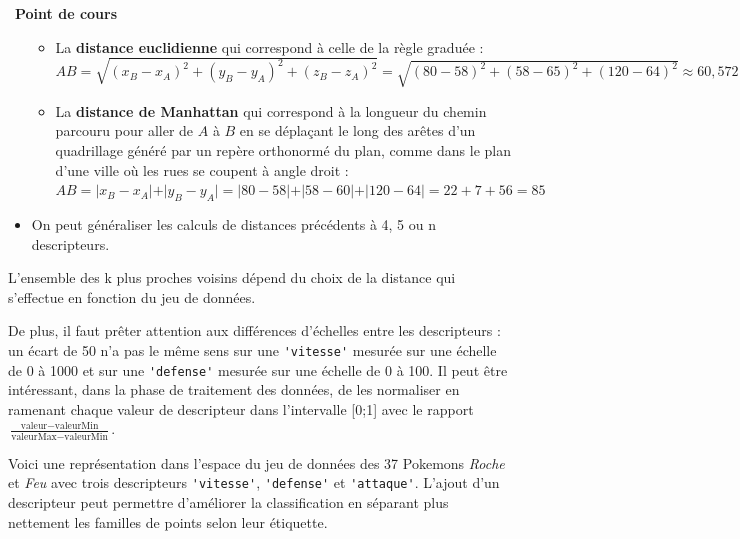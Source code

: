 \documentclass[
  11pt,
]{article}
\newcommand{\passthrough}[1]{#1}
\providecommand{\tightlist}{%
  \setlength{\itemsep}{0pt}\setlength{\parskip}{0pt}}
\newcounter{def}
\newcounter{cours}
\newenvironment{cours}[1]
{\par \medskip   \addtocounter{cours}{1} \noindent  
\begin{bclogo}[arrondi =0.1,  ombre = true, barre=none, logo=\bcbook, marge=4]{~\textbf{Point de cours} \textbf{\thecours} {\itshape #1} }  \par}
{
\end{bclogo}
 \par \bigskip }
\begin{document}
\begin{cours}{}
\begin{itemize}
  \begin{itemize}
  \tightlist
  \item
    La \textbf{distance euclidienne} qui correspond à celle de la règle
    graduée :\\
    \(AB=\sqrt{(x_{B}-x_{A})^{2}+(y_{B}-y_{A})^{2} + (z_{B}-z_{A})^{2}}=\sqrt{(80-58)^{2}+ (58-65)^{2} + (120 - 64)^{2}} \approx 60,572\)
  \item
    La \textbf{distance de Manhattan} qui correspond à la longueur du
    chemin parcouru pour aller de \(A\) à \(B\) en se déplaçant le long
    des arêtes d'un quadrillage généré par un repère orthonormé du plan,
    comme dans le plan d'une ville où les rues se coupent à angle droit
    :
    \(AB=\vert x_{B}-x_{A} \vert + \vert y_{B}-y_{A} \vert =\vert 80 - 58 \vert + \vert 58 - 60 \vert + \vert 120 - 64 \vert = 22 + 7 + 56 = 85\)
  \end{itemize}
\item
  On peut généraliser les calculs de distances précédents à 4, 5 ou n
  descripteurs.
\end{itemize}

L'ensemble des k plus proches voisins dépend du choix de la distance qui
s'effectue en fonction du jeu de données.

De plus, il faut prêter attention aux différences d'échelles entre les
descripteurs : un écart de 50 n'a pas le même sens sur une
\passthrough{\lstinline!'vitesse'!} mesurée sur une échelle de 0 à 1000
et sur une \passthrough{\lstinline!'defense'!} mesurée sur une échelle
de 0 à 100. Il peut être intéressant, dans la phase de traitement des
données, de les normaliser en ramenant chaque valeur de descripteur dans
l'intervalle {[}0;1{]} avec le rapport
\(\frac{\text{valeur}-\text{valeurMin}}{\text{valeurMax}-\text{valeurMin}}\).

\end{cours}

Voici une représentation dans l'espace du jeu de données des 37 Pokemons
\emph{Roche} et \emph{Feu} avec trois descripteurs
\passthrough{\lstinline!'vitesse'!}, \passthrough{\lstinline!'defense'!}
et \passthrough{\lstinline!'attaque'!}. L'ajout d'un descripteur peut
permettre d'améliorer la classification en séparant plus nettement les
familles de points selon leur étiquette.
\end{document}

